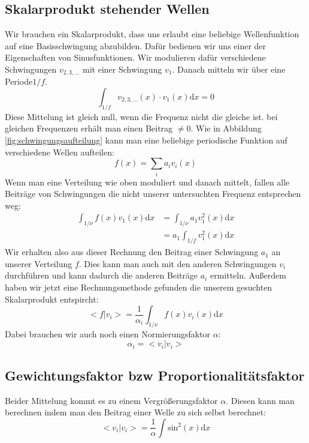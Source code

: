 \subsection{Skalarprodukt stehender Wellen}
Wir brauchen ein Skalarprodukt, dass uns erlaubt eine beliebige Wellenfunktion auf eine Basisschwingung abzubilden. Dafür bedienen wir uns einer der Eigenschaften von Sinusfunktionen.
Wir modulieren dafür verschiedene Schwingungen $v_{2,3,\dots}$ mit einer Schwingung $v_1$. Danach mitteln wir über eine Periode$1/f$.
\begin{equation}
	\int_{1/f}  v_{2,3,\dots} (x) \cdot v_1(x) \mathrm{d}x = 0
\end{equation}
Diese Mittelung ist gleich null, wenn die Frequenz nicht die gleiche ist. bei gleichen Frequenzen erhält man einen Beitrag $\neq 0$.
Wie in Abbildung \ref{fig:schwingungsaufteilung} kann man eine beliebige periodische Funktion auf verschiedene Wellen aufteilen:
\begin{equation}
	f(x) = \sum_i a_i v_i(x)
\end{equation}
Wenn man eine Verteilung wie oben moduliert und danach mittelt, fallen alle Beiträge von Schwingungen die nicht unserer untersuchten Frequenz entsprechen weg:
\begin{eqnarray}
	\int_{1/\nu} f(x) v_1(x) \mathrm{d}x&=\int_{1/\nu} a_1v_1^2(x)  \mathrm{d}x\\
	&=a_1\int_{1/f} v_1^2(x)  \mathrm{d}x
\end{eqnarray}
Wir erhalten also aus dieser Rechnung den Beitrag einer Schwingung $a_1$ an unserer Verteilung $f$. Dies kann man auch mit den anderen Schwingungen $v_i$ durchführen und kann dadurch die anderen Beiträge $a_i$ ermitteln. Außerdem haben wir jetzt eine Rechnungsmethode gefunden die unserem gesuchten Skalarprodukt entspircht:
\begin{equation}
	< f | v_i > =  \frac{1}{\alpha_i}\int_{1/\nu} f(x) v_i(x) \mathrm{d}x
\end{equation}
Dabei brauchen wir auch noch einen Normierungsfaktor $\alpha$:
\begin{equation}
	\alpha_i = <v_i| v_i>
\end{equation}

\subsection{Gewichtungsfaktor bzw Proportionalitätsfaktor}
Beider Mittelung kommt es zu einem Vergrößerungsfaktor $\alpha$. Diesen kann man berechnen indem man den Beitrag einer Welle zu sich selbst berechnet:
\begin{equation}
	< v_i|v_i> = \frac{1}{\alpha} \int \mathrm{sin}^2(x) \mathrm{d}x
\end{equation}

